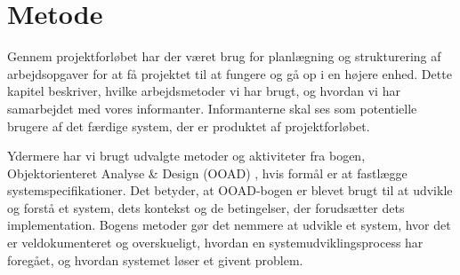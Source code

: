\chapter{Metode}
\label{chap:metode}

Gennem projektforløbet har der været brug for planlægning og strukturering af arbejdsopgaver for at få projektet til at fungere og gå op i en højere enhed. Dette kapitel beskriver, hvilke arbejdsmetoder vi har brugt, og hvordan vi har samarbejdet med vores informanter. Informanterne skal ses som potentielle brugere af det færdige system, der er produktet af projektforløbet.

Ydermere har vi brugt udvalgte metoder og aktiviteter fra bogen, Objektorienteret Analyse \& Design (OOAD) \cite{ooad}, hvis formål er at fastlægge systemspecifikationer. Det betyder, at OOAD-bogen er blevet brugt til at udvikle og forstå et system, dets kontekst og de betingelser, der forudsætter dets implementation. Bogens metoder gør det nemmere at udvikle et system, hvor det er veldokumenteret og overskueligt, hvordan en systemudviklingsprocess har foregået, og hvordan systemet løser et givent problem.




